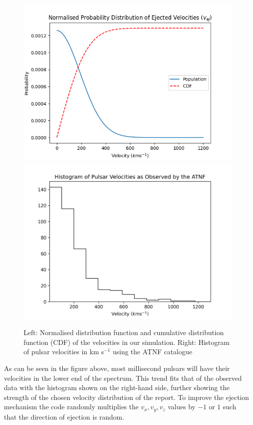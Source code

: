 \begin{figure}[H]
\centering
\includegraphics[scale=0.46]{CDFPDFVelocities.png}
\includegraphics[scale=0.46]{Histogram.png}
\caption{Left: Normalised distribution function and cumulative distribution function (CDF) of the velocities in our simulation. Right: Histogram of pulsar velocities in km s$^{-1}$ using the ATNF catalogue \citep{AustraliaPulsar}}
\label{CDFPDF}
\end{figure}

As can be seen in the figure above, most millisecond pulsars will have their velocities in the lower end of the spectrum. This trend fits that of the observed data with the histogram shown on the right-hand side, further showing the strength of the chosen velocity distribution of the report. To improve the ejection mechanism the code randomly multiplies the $v_x, v_y, v_z$ values by $-1$ or $1$ such that the direction of ejection is random.

